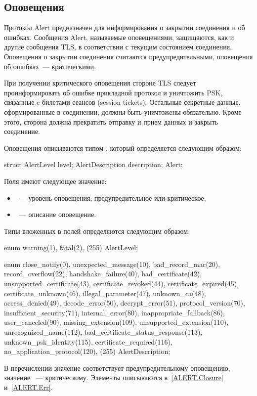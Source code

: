 \subsection{Оповещения}\label{ALERT.Alerts}

Протокол Alert предназначен для информирования о закрытии соединения и об
ошибках. Сообщения Alert, называемые оповещениями, защищаются, как и другие
сообщения TLS, в соответствии с текущим состоянием соединения.
%
Оповещения о закрытии соединения считаются предупредительными,
оповещения об ошибках~--- критическими.

При получении критического оповещения стороне TLS следует проинформировать об
ошибке прикладной протокол и уничтожить PSK, связанные c билетами сеансов
(session tickets).
%
Остальные секретные данные, сформированные в соединении, должны быть уничтожены 
обязательно. Кроме этого, сторона должна прекратить отправку и прием данных и 
закрыть соединение.

Оповещения описываются типом , который определяется следующим образом:

\begin{codeblock}
struct {
  AlertLevel level;
  AlertDescription description;
} Alert;
\end{codeblock}

Поля  имеют следующее значение:
\begin{itemize}
\item
{}~--- уровень оповещения: предупредительное или критическое;
\item
{}~--- описание оповещение.
\end{itemize}

Типы вложенных в  полей определяются следующим образом:

\begin{codeblock}
enum { warning(1), fatal(2), (255) } AlertLevel;

enum {
  close_notify(0),
  unexpected_message(10),
  bad_record_mac(20),
  record_overflow(22),
  handshake_failure(40),
  bad_certificate(42),
  unsupported_certificate(43),
  certificate_revoked(44),
  certificate_expired(45),
  certificate_unknown(46),
  illegal_parameter(47),
  unknown_ca(48),
  access_denied(49),
  decode_error(50),
  decrypt_error(51),
  protocol_version(70),
  insufficient_security(71),
  internal_error(80),
  inappropriate_fallback(86),
  user_canceled(90),
  missing_extension(109),
  unsupported_extension(110),
  unrecognized_name(112),
  bad_certificate_status_response(113),
  unknown_psk_identity(115),
  certificate_required(116),
  no_application_protocol(120),
  (255)
} AlertDescription;
\end{codeblock}

В перечислении  значение  соответствует 
предупредительному оповещению, значение ~--- критическому. 
Элементы  описываются в~\ref{ALERT.Closure} 
и~\ref{ALERT.Err}.
